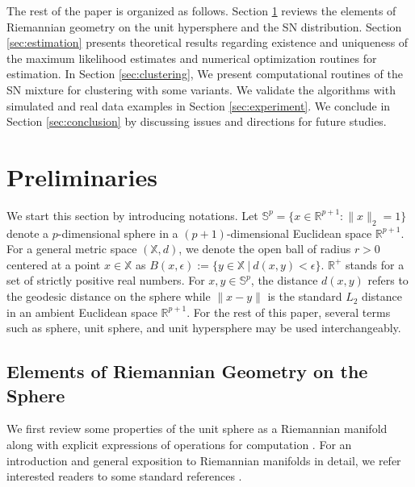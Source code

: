 \documentclass[11pt]{article}
\newcommand{\bbR}{\mathbb{R}}
\newcommand{\bbS}{\mathbb{S}}
\newcommand{\bbX}{\mathbb{X}}
\begin{document}
The rest of the paper is organized as follows. Section \ref{sec:preliminaries} reviews the elements of Riemannian geometry on the unit hypersphere and the SN distribution. Section \ref{sec:estimation} presents theoretical results regarding existence and uniqueness of the maximum likelihood estimates and numerical optimization routines for estimation. In Section \ref{sec:clustering}, We present computational routines of the SN mixture for clustering with some variants. We validate the algorithms with simulated and real data examples in Section \ref{sec:experiment}. We conclude in Section \ref{sec:conclusion} by discussing issues and directions for future studies. 



\section{Preliminaries}\label{sec:preliminaries}


We start this section by introducing notations. Let $\bbS^p = \lbrace x \in \bbR^{p+1} : \|x\|_2 = 1 \rbrace $ denote a $p$-dimensional sphere in a $(p+1)$-dimensional Euclidean space $\bbR^{p+1}$. For a general metric space $(\bbX, d)$, we denote the open ball of radius $r > 0$ centered at a point $x \in \bbX$ as $B (x, \epsilon) := \lbrace y\in\bbX ~|~ d(x,y) < \epsilon \rbrace $. $\bbR^+$ stands for a set of strictly positive real numbers. For $x,y\in \bbS^p$, the distance $d(x,y)$ refers to the geodesic distance on the sphere while $\|x-y\|$ is the standard $L_2$ distance in an ambient Euclidean space $\bbR^{p+1}$. For the rest of this paper, several terms such as sphere, unit sphere, and unit hypersphere may be used interchangeably.


\subsection{Elements of Riemannian Geometry on the Sphere}

We first review some properties of the unit sphere as a Riemannian manifold along with explicit expressions of operations for computation \citep{absil_optimization_2008-1}. For an introduction and general exposition to Riemannian manifolds in detail, we refer interested readers to some standard references \citep{carmo_riemannian_1992, lee_riemannian_1997}.
\end{document}
